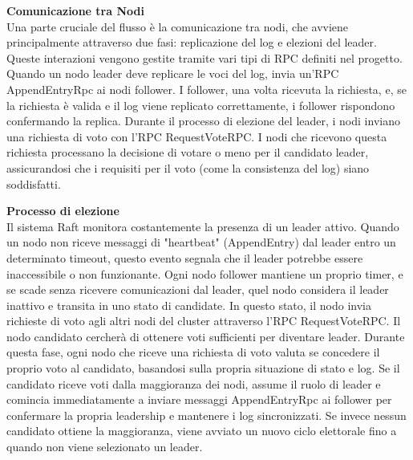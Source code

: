 \textbf{Comunicazione tra Nodi}\\
Una parte cruciale del flusso è la comunicazione tra nodi, che avviene principalmente attraverso due fasi: replicazione del log e elezioni del leader. Queste interazioni vengono gestite tramite vari tipi di RPC definiti 
nel progetto.
Quando un nodo leader deve replicare le voci del log, invia un'RPC AppendEntryRpc ai nodi follower. I follower, una volta ricevuta la richiesta, e, se la richiesta è valida e il log viene replicato correttamente, i follower 
rispondono confermando la replica.
Durante il processo di elezione del leader, i nodi inviano una richiesta di voto con l'RPC RequestVoteRPC. I nodi che ricevono questa richiesta processano la decisione di votare o meno per il candidato leader, assicurandosi 
che i requisiti per il voto (come la consistenza del log) siano soddisfatti.

\textbf{Processo di elezione}\\
Il sistema Raft monitora costantemente la presenza di un leader attivo. Quando un nodo non riceve messaggi di "heartbeat" (AppendEntry) dal leader entro un determinato timeout, questo evento segnala che il leader potrebbe essere 
inaccessibile o non funzionante. Ogni nodo follower mantiene un proprio timer, e se scade senza ricevere comunicazioni dal leader, quel nodo considera il leader inattivo e transita in uno stato di candidate.
In questo stato, il nodo invia richieste di voto agli altri nodi del cluster attraverso l'RPC RequestVoteRPC. Il nodo candidato cercherà di ottenere voti sufficienti per diventare leader. Durante questa fase, 
ogni nodo che riceve una richiesta di voto valuta se concedere il proprio voto al candidato, basandosi sulla propria situazione di stato e log.
Se il candidato riceve voti dalla maggioranza dei nodi, assume il ruolo di leader e comincia immediatamente a inviare messaggi AppendEntryRpc ai follower per confermare la propria leadership e mantenere i log sincronizzati. 
Se invece nessun candidato ottiene la maggioranza, viene avviato un nuovo ciclo elettorale fino a quando non viene selezionato un leader. 

